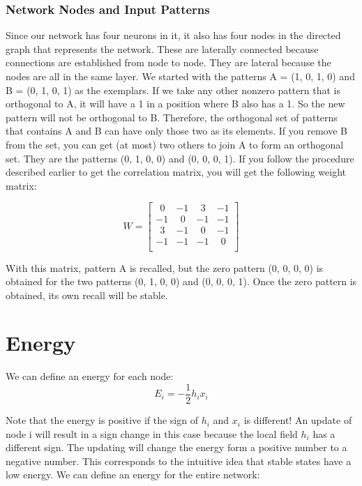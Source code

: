 \documentclass[12pt, right open]{memoir}
\newcommand{\matplus}{
~~
  }
\begin{document}
\subsubsection{Network Nodes and Input Patterns}
Since our network has four neurons in it, it also has four nodes in the directed
graph that represents the network. These are laterally connected because
connections are established from node to node. They are lateral because the
nodes are all in the same layer. We started with the patterns A = (1, 0, 1, 0)
and B = (0, 1, 0, 1) as the exemplars. If we take any other nonzero pattern that
is orthogonal to A, it will have a 1 in a position where B also has a 1. So the
new pattern will not be orthogonal to B. Therefore, the orthogonal set of
patterns that contains A and B can have only those two as its elements. If you
remove B from the set, you can get (at most) two others to join A to form an
orthogonal set. They are the patterns (0, 1, 0, 0) and (0, 0, 0, 1).
If you follow the procedure described earlier to get the correlation matrix, you
will get the following weight matrix:


\[ 
W = \begin{bmatrix}
 \matplus0 & -1         &  \matplus3 & -1 \\
  -1       &  \matplus0 &  -1        &  -1 \\
 \matplus3 & -1         &  \matplus0 & -1 \\
-1         &  -1        & -1         &  \matplus0 \\
\end{bmatrix}
\]

With this matrix, pattern A is recalled, but the zero pattern (0, 0, 0, 0) is
obtained for the two patterns (0, 1, 0, 0) and (0, 0, 0, 1). Once the zero pattern
is obtained, its own recall will be stable.

\section{Energy}
We can define an energy for each node:
\[
E_i = - \frac{1}{2}h_ix_i
\]

Note that the energy is positive if the sign of $h_i$ and $x_i$
is different! An update of node i will result in a sign change in this case because the local field $h_i$ has a different sign. The updating will change the energy form a positive number
to a negative number. This corresponds to the intuitive idea that stable states
have a low energy. We can define an energy for the entire network:
\end{document}
